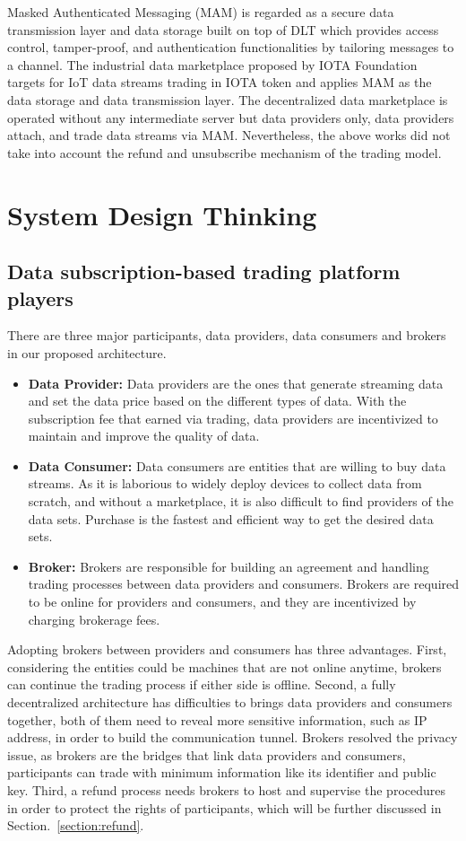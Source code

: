 \documentclass[10pt, conference, compsocconf]{IEEEtran}
\begin{document}
Masked Authenticated Messaging (MAM)\cite{MAM} is regarded as a secure data transmission layer and data storage built on top of DLT which provides access control, tamper-proof, and authentication functionalities by tailoring messages to a channel. The industrial data marketplace\cite{IOTAIdustryMarketplace} proposed by IOTA Foundation targets for IoT data streams trading in IOTA token and applies MAM as the data storage and data transmission layer. The decentralized data marketplace\cite{DDMSmartCities} is operated without any intermediate server but data providers only, data providers attach, and trade data streams via MAM. Nevertheless, the above works did not take into account the refund and unsubscribe mechanism of the trading model.
 
\section{System Design Thinking}
\label{section:design_thinking}
\subsection{Data subscription-based trading platform players}
There are three major participants, data providers, data consumers and brokers in our proposed architecture.

\begin{itemize}
\item \textbf{Data Provider: }
Data providers are the ones that generate streaming data and set the data price based on the different types of data. With the subscription fee that earned via trading, data providers are incentivized to maintain and improve the quality of data.
\item \textbf{Data Consumer: }
Data consumers are entities that are willing to buy data streams. As it is laborious to widely deploy devices to collect data from scratch, and without a marketplace, it is also difficult to find providers of the data sets. Purchase is the fastest and efficient way to get the desired data sets.
\item \textbf{Broker: }
Brokers are responsible for building an agreement and handling trading processes between data providers and consumers. Brokers are required to be online for providers and consumers, and they are incentivized by charging brokerage fees.
\end{itemize}

Adopting brokers between providers and consumers has three advantages. First, considering the entities could be machines that are not online anytime, brokers can continue the trading process if either side is offline. Second, a fully decentralized architecture has difficulties to brings data providers and consumers together, both of them need to reveal more sensitive information, such as IP address, in order to build the communication tunnel. Brokers resolved the privacy issue, as brokers are the bridges that link data providers and consumers, participants can trade with minimum information like its identifier and public key. Third, a refund process needs brokers to host and supervise the procedures in order to protect the rights of participants, which will be further discussed in Section.~\ref{section:refund}.
\end{document}

